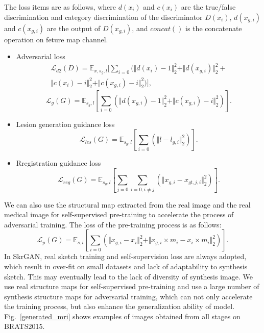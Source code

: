 \documentclass[runningheads]{llncs}
\begin{document}
	The loss items are as follows, where $d(x_{i})$ and $c(x_{i})$ are the true/false discrimination and category discrimination of the discriminator $D(x_i)$, $d(x_{g, i})$ and $c(x_{g,i})$ are the output of $D(x_{g,i})$, and $concat()$ is the concatenate operation on feture map channel. 
	\begin{itemize}
		\item{Adversarial loss}
		\begin{equation}
		\begin{split}
		\mathcal{L}_{d2}(D)=\mathbb{E}_{x,s_g,l}[\sum\limits_{i=0}(\Vert{d(x_i)-1}\Vert_{2}^{2}+\Vert{d(x_{g,i})}\Vert_{2}^{2}+\\
		\Vert{c(x_i)-i}\Vert_{2}^{2}+\Vert{c(x_{g,i})-i}\Vert_{2}^{2})],
		\end{split}
		\end{equation}
		\begin{equation}
		\mathcal{L}_{g}(G)=\mathbb{E}_{s_g,l}[\sum\limits_{i=0}(\Vert{d(x_{g,i})-1}\Vert_{2}^{2}+\Vert{c(x_{g,i})-i}\Vert_{2}^{2})].
		\end{equation}
		\item{Lesion generation guidance loss}
		\begin{equation}
		\mathcal{L}_{les}(G)=\mathbb{E}_{s_g,l}[\sum\limits_{i=0}(\Vert{l-l_{g,i}}\Vert_{2}^{2})].
		\end{equation}
		\item{Rregistration guidance loss}
		\begin{equation}
		\mathcal{L}_{reg}(G)=\mathbb{E}_{s_g,l}[\sum\limits_{j=0}\sum\limits_{i=0,i\neq j}(\Vert{x_{g,i}-x_{gt,j,i}}\Vert_{2}^{2})].
		\end{equation}
	\end{itemize}
	We can also use the structural map extracted from the real image and the real medical image for self-supervised pre-training to accelerate the process of adversarial training. The loss of the pre-training process is as follows:
	\begin{equation}
	\mathcal{L}_{p}(G)=\mathbb{E}_{s,l}[\sum\limits_{i=0}(\Vert{x_{g,i}-x_i}\Vert_{2}^{2}+\Vert{x_{g,i}\times m_i-x_{i}\times m_i}\Vert_{2}^{2})].
	\end{equation}
	In SkrGAN\cite{96zhang2019skrgan:}, real sketch training and self-supervision loss are always adopted, which result in over-fit on small datasets and lack of adaptability to synthesis sketch. This may eventually lead to the lack of diversity of synthesis image. We use real structure maps for self-supervised pre-training and use a large number of synthesis structure maps for adversarial training, which can not only accelerate the training process, but also enhance the generalization ability of model. Fig.~\ref{generated_mri} shows examples of images obtained from all stages on BRATS2015.
\end{document}
